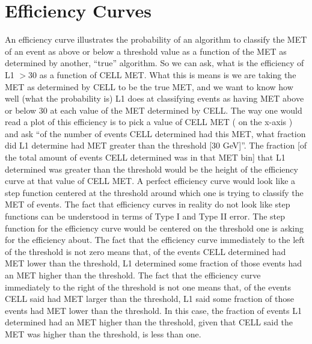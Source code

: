 \section{Efficiency Curves}
An efficiency curve illustrates the probability of an algorithm to classify the MET of an event as above or below a threshold value as a function of the MET as determined by another, ``true'' algorithm. 
So we can ask, what is the efficiency of L1 $> 30$ as a function of CELL MET. What this is means is we are taking the MET as determined by CELL to be the true MET, and we want to know how well (what the probability is) L1 does at classifying events as having MET above or below $30$ at each value of the MET determined by CELL. 
The way one would read a plot of this efficiency is to pick a value of CELL MET ( on the x-axis ) and ask ``of the number of events CELL determined had this MET, what fraction did L1 determine had MET greater than the threshold [30 GeV]''. 
The fraction [of the total amount of events CELL determined was in that MET bin] that L1 determined was greater than the threshold would be the height of the efficiency curve at that value of CELL MET.
A perfect efficiency curve would look like a step function centered at the threshold around which one is trying to classify the MET of events. 
The fact that efficiency curves in reality do not look like step functions can be understood in terms of Type I and Type II error. 
The step function for the efficiency curve would be centered on the threshold one is asking for the efficiency about. 
The fact that the efficiency curve immediately to the left of the threshold is not zero means that, of the events CELL determined had MET lower than the threshold, L1 determined some fraction of those events had an MET higher than the threshold. 
The fact that the efficiency curve immediately to the right of the threshold is not one means that, of the events CELL said had MET larger than the threshold, L1 said some fraction of those events had MET lower than the threshold. 
In this case, the fraction of events L1 determined had an MET higher than the threshold, given that CELL said the MET was higher than the threshold, is less than one.

